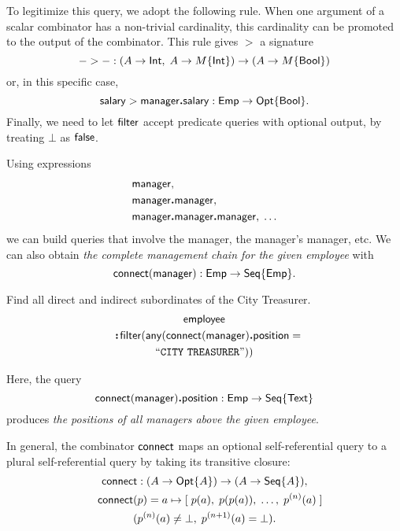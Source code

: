 To legitimize this query, we adopt the following rule.  When one argument of a
scalar combinator has a non-trivial cardinality, this cardinality can be
promoted to the output of the combinator.  This rule gives ${>}$ a signature
\begin{equation*}
    {-}>{-} : (A \to \mathsf{Int},\; A \to M\{\mathsf{Int}\}) \to (A \to M\{\mathsf{Bool}\})
\end{equation*}
or, in this specific case,
\begin{equation*}
    \mathsf{salary} > \mathsf{manager}\boldsymbol{.}\mathsf{salary} : \mathsf{Emp} \to \mathsf{Opt}{\left\{\mathsf{Bool}\right\}}.
\end{equation*}
Finally, we need to let $\mathsf{filter}$ accept predicate queries with optional
output, by treating $\bot$ as $\mathsf{false}$.

Using expressions
\begin{align*}
    & \mathsf{manager}, \\
    & \mathsf{manager}\boldsymbol{.}\mathsf{manager}, \\
    & \mathsf{manager}\boldsymbol{.}\mathsf{manager}\boldsymbol{.}\mathsf{manager},\; \ldots
\end{align*}
we can build queries that involve the manager, the manager's manager, etc.  We
can also obtain \emph{the complete management chain for the given employee}
with
\begin{equation*}
    \mathsf{connect}(\mathsf{manager}) : \mathsf{Emp} \to \mathsf{Seq}{\left\{\mathsf{Emp}\right\}}.
\end{equation*}

\begin{demo}
    \label{ex:city-treasurer-subordinates}
    Find all direct and indirect subordinates of the City Treasurer.
    \begin{multline*}
        \Employee \\
        \shoveleft{\Apply\Filter(\Any(\Connect(\Manager)\To\Position =} \\
        \textliteral{CITY\ TREASURER}))
    \end{multline*}
\end{demo}

Here, the query
\begin{equation*}
    \mathsf{connect}(\mathsf{manager})\boldsymbol{.}\mathsf{position} : \mathsf{Emp} \to \mathsf{Seq}{\left\{\mathsf{Text}\right\}}
\end{equation*}
produces \emph{the positions of all managers above the given employee}.

In general, the combinator $\mathsf{connect}$ maps an optional self-referential query to a
plural self-referential query by taking its transitive closure:
\begin{multline*}
    \Connect : (A \to \Opt{A}) \to (A \to \Seq{A}), \\
    \shoveleft{\Connect(p) = a \mapsto [\;p(a),\; p(p(a)),\; \ldots,\; p^{(n)}(a)\;]} \\
    (p^{(n)}(a) \ne \bot,\; p^{(n+1)}(a) = \bot).
\end{multline*}

